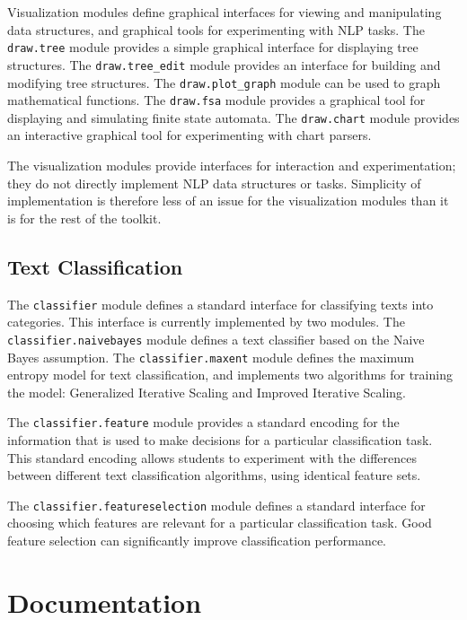 \documentclass[11pt]{article}
\begin{document}
Visualization modules define graphical interfaces for viewing and
manipulating data structures, and graphical tools for experimenting
with NLP tasks.  The \texttt{draw.tree} module provides a simple
graphical interface for displaying tree structures.  The
\texttt{draw.tree\_edit} module provides an interface for building and
modifying tree structures.  The \texttt{draw.plot\_graph} module can be
used to graph mathematical functions.  The \texttt{draw.fsa} module
provides a graphical tool for displaying and simulating finite state
automata.  The \texttt{draw.chart} module provides an interactive
graphical tool for experimenting with chart parsers.

The visualization modules provide interfaces for interaction and
experimentation; they do not directly implement NLP data structures or
tasks.  Simplicity of implementation is therefore less of an issue for
the visualization modules than it is for the rest of the toolkit.

\subsection*{Text Classification}

The \texttt{classifier} module defines a standard interface for
classifying texts into categories.  This interface is currently
implemented by two modules.  The \texttt{classifier.naivebayes} module
defines a text classifier based on the Naive Bayes assumption. The
\texttt{classifier.maxent} module defines the maximum entropy model
for text classification, and implements two algorithms for training
the model: Generalized Iterative Scaling and Improved Iterative
Scaling.

The \texttt{classifier.feature} module provides a standard encoding
for the information that is used to make decisions for a particular
classification task.  This standard encoding allows students to
experiment with the differences between different text classification
algorithms, using identical feature sets.

The \texttt{classifier.featureselection} module defines a standard
interface for choosing which features are relevant for a particular
classification task.  Good feature selection can significantly improve
classification performance.

\section{Documentation}
\label{sec:documentation}
\end{document}

